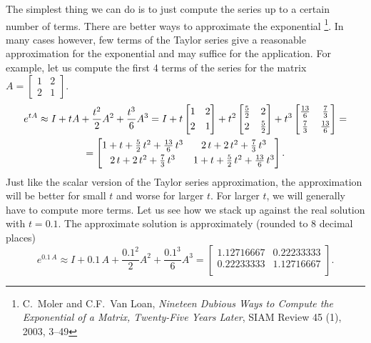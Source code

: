 The simplest thing we can do
is to just compute the series up to a certain number of terms.  There
are better ways to approximate the exponential%
\footnote{C.\ Moler and C.F.\ Van Loan, \emph{Nineteen Dubious Ways
to Compute the Exponential of a Matrix, Twenty-Five Years Later}, SIAM Review
45 (1), 2003, 3--49}.  In many cases however,
few terms of the Taylor series give
a reasonable approximation for the exponential and may suffice for
the application.  For example, let us compute the first 4 terms of the
series for the matrix $A = 
\left[ \begin{smallmatrix}
1 & 2 \\
2 & 1
\end{smallmatrix} \right]$.
\begin{multline*}
e^{tA}
\approx
I + tA + \frac{t^2}{2}A^2 + \frac{t^3}{6}A^3
=
I + t
\begin{bmatrix}
1 & 2 \\
\noalign{\smallskip}
2 & 1
\end{bmatrix}
+ t^2
\begin{bmatrix}
\frac{5}{2} & 2 \\
\noalign{\smallskip}
2 & \frac{5}{2}
\end{bmatrix}
+ t^3
\begin{bmatrix}
\frac{13}{6} & \frac{7}{3} \\
\noalign{\smallskip}
\frac{7}{3} & \frac{13}{6}
\end{bmatrix}
=
\\
=
\begin{bmatrix}
1 + t + \frac{5}{2}\, t^2 + \frac{13}{6}\, t^3 &
   2\,t + 2\, t^2   + \frac{7}{3}\, t^3 \\
\noalign{\smallskip}
   2\,t + 2\, t^2   + \frac{7}{3}\, t^3 &
1 + t + \frac{5}{2}\, t^2 + \frac{13}{6}\, t^3
\end{bmatrix} .
\end{multline*}
Just like the scalar version of the Taylor series approximation, the
approximation will be better for small $t$ and worse for larger $t$.  For
larger $t$, we will generally have to compute more terms.
Let us see how we stack up against the real solution with $t=0.1$.  The
approximate solution is approximately (rounded to 8 decimal places)
\begin{equation*}
e^{0.1\,A} \approx
I + 0.1\,A + \frac{0.1^2}{2}A^2 + \frac{0.1^3}{6}A^3
=
\begin{bmatrix}
1.12716667 & 0.22233333 \\
0.22233333 & 1.12716667 \\
\end{bmatrix} .
\end{equation*}
